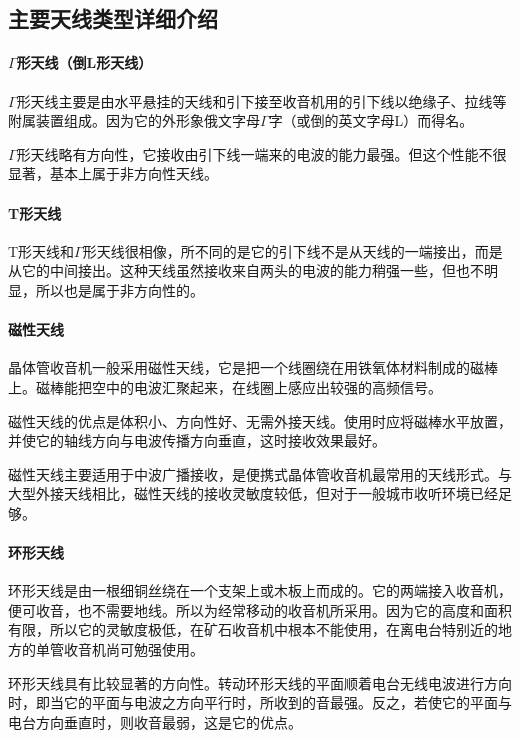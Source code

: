 \documentclass[12pt,UTF8]{ctexbook}
\begin{document}
\subsection{主要天线类型详细介绍}

\paragraph{$\Gamma$形天线（倒L形天线）}
$\Gamma$形天线主要是由水平悬挂的天线和引下接至收音机用的引下线以绝缘子、拉线等附属装置组成。因为它的外形象俄文字母$\Gamma$字（或倒的英文字母L）而得名。
   
   $\Gamma$形天线略有方向性，它接收由引下线一端来的电波的能力最强。但这个性能不很显著，基本上属于非方向性天线。

   \paragraph{T形天线}
   T形天线和$\Gamma$形天线很相像，所不同的是它的引下线不是从天线的一端接出，而是从它的中间接出。这种天线虽然接收来自两头的电波的能力稍强一些，但也不明显，所以也是属于非方向性的。

   \paragraph{磁性天线}
   晶体管收音机一般采用磁性天线，它是把一个线圈绕在用铁氧体材料制成的磁棒上。磁棒能把空中的电波汇聚起来，在线圈上感应出较强的高频信号。

   磁性天线的优点是体积小、方向性好、无需外接天线。使用时应将磁棒水平放置，并使它的轴线方向与电波传播方向垂直，这时接收效果最好。

   磁性天线主要适用于中波广播接收，是便携式晶体管收音机最常用的天线形式。与大型外接天线相比，磁性天线的接收灵敏度较低，但对于一般城市收听环境已经足够。

   \paragraph{环形天线}
   环形天线是由一根细铜丝绕在一个支架上或木板上而成的。它的两端接入收音机，便可收音，也不需要地线。所以为经常移动的收音机所采用。因为它的高度和面积有限，所以它的灵敏度极低，在矿石收音机中根本不能使用，在离电台特别近的地方的单管收音机尚可勉强使用。

   环形天线具有比较显著的方向性。转动环形天线的平面顺着电台无线电波进行方向时，即当它的平面与电波之方向平行时，所收到的音最强。反之，若使它的平面与电台方向垂直时，则收音最弱，这是它的优点。
\end{document}
